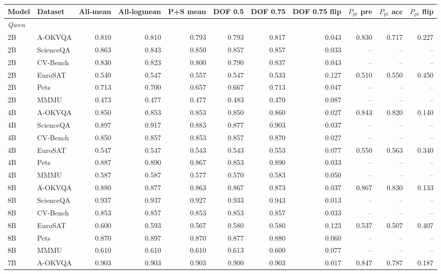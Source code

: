 \begin{tabular}{llrrrrrrrrr}
\toprule
Model & Dataset & All-mean & All-logmean & P+S mean & DOF 0.5 & DOF 0.75 & DOF 0.75 flip & $P_{\mathrm{pt}}$ pre & $P_{\mathrm{pt}}$ acc & $P_{\mathrm{pt}}$ flip \\
\midrule
\multicolumn{11}{l}{\textit{Qwen}} \\
2B & A-OKVQA & 0.810 & 0.810 & 0.793 & 0.793 & 0.817 & 0.043 & 0.830 & 0.717 & 0.227 \\
2B & ScienceQA & 0.863 & 0.843 & 0.850 & 0.857 & 0.857 & 0.033 & -- & -- & -- \\
2B & CV-Bench & 0.830 & 0.823 & 0.800 & 0.790 & 0.837 & 0.043 & -- & -- & -- \\
2B & EuroSAT & 0.540 & 0.547 & 0.557 & 0.547 & 0.533 & 0.127 & 0.510 & 0.550 & 0.450 \\
2B & Pets & 0.713 & 0.700 & 0.657 & 0.667 & 0.713 & 0.047 & -- & -- & -- \\
2B & MMMU & 0.473 & 0.477 & 0.477 & 0.483 & 0.470 & 0.087 & -- & -- & -- \\
4B & A-OKVQA & 0.850 & 0.853 & 0.853 & 0.850 & 0.860 & 0.027 & 0.843 & 0.820 & 0.140 \\
4B & ScienceQA & 0.897 & 0.917 & 0.883 & 0.877 & 0.903 & 0.037 & -- & -- & -- \\
4B & CV-Bench & 0.850 & 0.857 & 0.853 & 0.857 & 0.870 & 0.027 & -- & -- & -- \\
4B & EuroSAT & 0.547 & 0.547 & 0.543 & 0.543 & 0.553 & 0.077 & 0.550 & 0.563 & 0.340 \\
4B & Pets & 0.887 & 0.890 & 0.867 & 0.853 & 0.890 & 0.033 & -- & -- & -- \\
4B & MMMU & 0.587 & 0.587 & 0.577 & 0.570 & 0.583 & 0.050 & -- & -- & -- \\
8B & A-OKVQA & 0.880 & 0.877 & 0.863 & 0.867 & 0.873 & 0.037 & 0.867 & 0.830 & 0.133 \\
8B & ScienceQA & 0.937 & 0.937 & 0.927 & 0.933 & 0.943 & 0.013 & -- & -- & -- \\
8B & CV-Bench & 0.853 & 0.857 & 0.853 & 0.853 & 0.857 & 0.033 & -- & -- & -- \\
8B & EuroSAT & 0.600 & 0.593 & 0.567 & 0.580 & 0.580 & 0.123 & 0.537 & 0.507 & 0.407 \\
8B & Pets & 0.870 & 0.897 & 0.870 & 0.877 & 0.880 & 0.060 & -- & -- & -- \\
8B & MMMU & 0.610 & 0.610 & 0.610 & 0.613 & 0.600 & 0.077 & -- & -- & -- \\
7B & A-OKVQA & 0.903 & 0.903 & 0.903 & 0.900 & 0.903 & 0.017 & 0.847 & 0.787 & 0.187 \\

\end{tabular}
